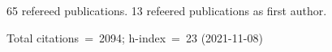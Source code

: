 65 refereed publications. 13 refeered publications as first author.

Total citations~=~2094; h-index~=~23 (2021-11-08)